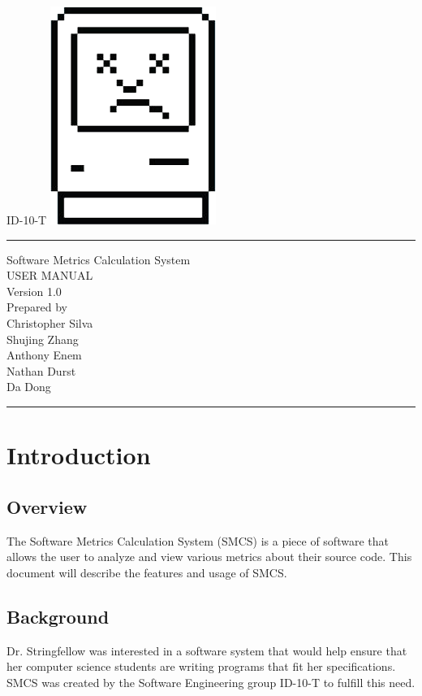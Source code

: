 \documentclass{scrreprt}
\author{Christopher Silva}
\date{}
\def\myversion{1.0 }
\begin{document}
	\begin{titlepage}
		\flushright
		\LARGE{ID-10-T}
		\includegraphics[scale=0.08]{logo.png}
		\rule{16cm}{5pt}\vskip1cm
		\centering
		\Huge{Software Metrics Calculation System}\\
		\vspace{2cm}
		\Huge{USER MANUAL}\\
		\vspace{2cm}
		\LARGE{Version \myversion\\}
		\vspace{2cm}
		Prepared by\\
	    Christopher Silva\\
	    Shujing Zhang\\
		Anthony Enem\\
		Nathan Durst\\
		Da Dong\\
		\vfill
		\rule{16cm}{5pt}
	\end{titlepage}
	\tableofcontents
	\chapter{Introduction}
	
	\section{Overview}
	The Software Metrics Calculation System (SMCS) is a piece of software that allows the user to analyze and view various metrics about their source code. 
	This document will describe the features and usage of SMCS.
	
	\section{Background}
	Dr. Stringfellow was interested in a software system that would help ensure that her computer science students are writing programs that fit her specifications.
	SMCS was created by the Software Engineering group ID-10-T to fulfill this need.
	
\end{document}

